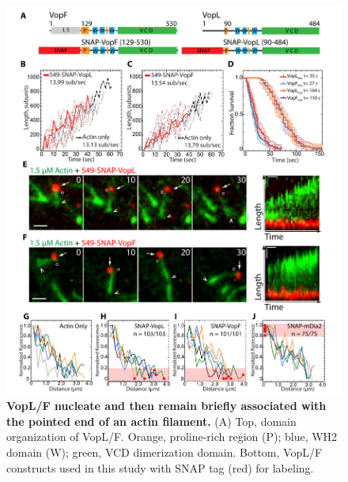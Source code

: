 \begin{figure}
\centering
\includegraphics[width=\textwidth]{img/ch04/Thesis_Vop.pdf}
\caption[ VopL/F nucleate and then remain briefly associated with the pointed end of an actin filament.]{\textbf{ VopL/F nucleate and then remain briefly associated with the pointed end of an actin filament.} (A) Top, domain organization of VopL/F. Orange, proline-rich region (P); blue, WH2 domain (W); green, VCD dimerization domain. Bottom, VopL/F constructs used in this study with SNAP tag (red) for labeling.}
\label{fig:vop}
\end{figure}

